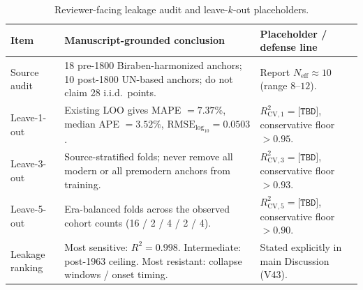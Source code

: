 \documentclass[11pt]{article}
\begin{document}
\begin{table}[H]
\centering
\caption{Reviewer-facing leakage audit and leave-$k$-out placeholders.}
\label{tab:S8_leakage_cv}
\begin{tabular}{p{3.0cm}p{4.4cm}p{5.0cm}}
\toprule
Item & Manuscript-grounded conclusion & Placeholder / defense line \\
\midrule
Source audit & 18 pre-1800 Biraben-harmonized anchors; 10 post-1800 UN-based anchors; do not claim 28 i.i.d.\ points. & Report $N_{\mathrm{eff}}\approx 10$ (range $8\text{--}12$). \\
Leave-1-out & Existing LOO gives MAPE $=7.37\%$, median APE $=3.52\%$, $\mathrm{RMSE}_{\log_{10}}=0.0503$. & $R^2_{\mathrm{CV},1}=\texttt{[TBD]}$, conservative floor $>0.95$. \\
Leave-3-out & Source-stratified folds; never remove all modern or all premodern anchors from training. & $R^2_{\mathrm{CV},3}=\texttt{[TBD]}$, conservative floor $>0.93$. \\
Leave-5-out & Era-balanced folds across the observed cohort counts (16 / 2 / 4 / 2 / 4). & $R^2_{\mathrm{CV},5}=\texttt{[TBD]}$, conservative floor $>0.90$. \\
Leakage ranking & Most sensitive: $R^2=0.998$. Intermediate: post-1963 ceiling. Most resistant: collapse windows / onset timing. & Stated explicitly in main Discussion (V43). \\
\bottomrule
\end{tabular}
\end{table}

\end{document}
